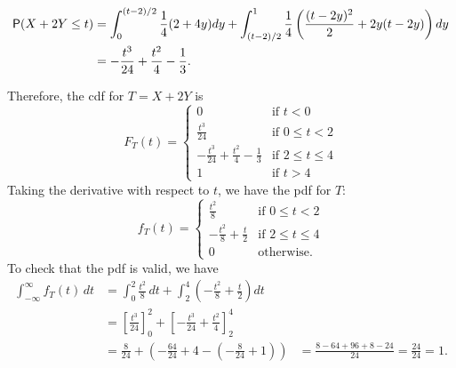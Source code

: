 \documentclass[12pt]{article}
\newcommand{\Prob}{{\sf P}}
\newenvironment{problem}[2][Problem]{\begin{trivlist}
\item[\hskip \labelsep {\bfseries #1}\hskip \labelsep {\bfseries #2.}]}
{\end{trivlist}}
\begin{document}
\begin{problem}{5}
\begin{itemize}
\begin{enumerate}
\begin{itemize}
\begin{align*}
          \Prob(X + 2Y \le t) &= 
          \int_0^{(t-2)/2} \frac{1}{4} (2 + 4y) dy +
          \int_{(t-2)/2}^{1} \frac{1}{4} \left( 
          \frac{(t - 2y)^2}{2} + 2y(t - 2y) \right) dy \\
          &= -\frac{t^3}{24} + \frac{t^2}{4}-\frac{1}{3}.
        \end{align*}
      \end{itemize}
      Therefore, the cdf for $T = X + 2Y$ is
      \[
        F_T(t) = \begin{cases}
          0 & \text{if } t < 0 \\
          \frac{t^3}{24} & \text{if } 0 \le t < 2 \\
          -\frac{t^3}{24} + \frac{t^2}{4}-\frac{1}{3} & \text{if } 2 \le t \le 4 \\
          1 & \text{if } t > 4
        \end{cases}
      \]
      Taking the derivative with respect to $t$, we have the pdf for $T$:
      \[
        f_T(t) = \begin{cases}
          \frac{t^2}{8} & \text{if } 0 \le t < 2 \\
          -\frac{t^2}{8} + \frac{t}{2} & \text{if } 2 \le t \le 4 \\
          0 & \text{otherwise.}
        \end{cases}
      \]
      To check that the pdf is valid, we have
      \begin{align*}
        \int_{-\infty}^{\infty} f_T(t) \, dt &= 
        \int_0^2 \frac{t^2}{8} \, dt + 
        \int_2^4 \left( -\frac{t^2}{8} + \frac{t}{2} \right) dt \\
        &= \left[ \frac{t^3}{24} \right]_0^2 + 
        \left[ -\frac{t^3}{24} + \frac{t^2}{4} \right]_2^4 \\
        &= \frac{8}{24} + \left( -\frac{64}{24} + 4 - 
        \left( -\frac{8}{24} + 1 \right) \right)
        &= \frac{8-64+96+8-24}{24} = \frac{24}{24} = 1.
      \end{align*}
    \end{enumerate}
  \end{itemize}
\end{problem}
\end{document}
